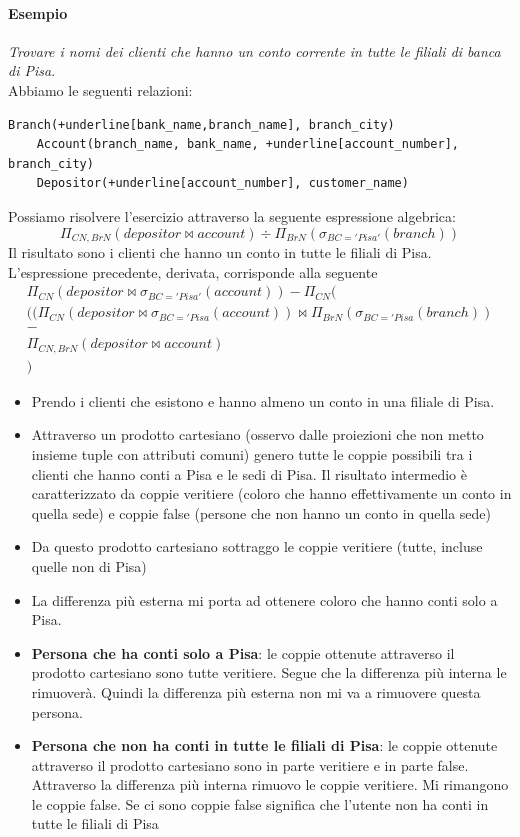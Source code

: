 \paragraph{Esempio} \emph{Trovare i nomi dei clienti che hanno un conto corrente in tutte le filiali di banca di Pisa}.\\Abbiamo le seguenti relazioni:
\begin{Verbatim}[commandchars=+\[\]]
	Branch(+underline[bank_name,branch_name], branch_city)
	Account(branch_name, bank_name, +underline[account_number], branch_city)
	Depositor(+underline[account_number], customer_name)
\end{Verbatim}
Possiamo risolvere l'esercizio attraverso la seguente espressione algebrica:
\[\Pi_{CN,BrN}(depositor \Join account) \div \Pi_{BrN}(\sigma_{BC='Pisa'}(branch))\]
Il risultato sono i clienti che hanno un conto in tutte le filiali di Pisa. L'espressione precedente, derivata, corrisponde alla seguente
\begin{align*}\Pi_{CN}(depositor \Join \sigma_{BC='Pisa'}(account)) - \Pi_{CN}(\\((\Pi_{CN}(depositor\Join \sigma_{BC='Pisa}(account)) \Join \Pi_{BrN}(\sigma_{BC='Pisa}(branch))\\-\\\Pi_{CN,BrN}(depositor \Join account)\\)\end{align*}
\begin{itemize}
	\item Prendo i clienti che esistono e hanno almeno un conto in una filiale di Pisa. 
	\item Attraverso un prodotto cartesiano (osservo dalle proiezioni che non metto insieme tuple con attributi comuni) genero tutte le coppie possibili tra i clienti che hanno conti a Pisa e le sedi di Pisa. Il risultato intermedio è caratterizzato da coppie veritiere (coloro che hanno effettivamente un conto in quella sede) e coppie false (persone che non hanno un conto in quella sede)
	\item Da questo prodotto cartesiano sottraggo le coppie veritiere (tutte, incluse quelle non di Pisa)
	\item La differenza più esterna mi porta ad ottenere coloro che hanno conti solo a Pisa.
	\item \textbf{Persona che ha conti solo a Pisa}: le coppie ottenute attraverso il prodotto cartesiano sono tutte veritiere. Segue che la differenza più interna le rimuoverà. Quindi la differenza più esterna non mi va a rimuovere questa persona.
	\item \textbf{Persona che non ha conti in tutte le filiali di Pisa}: le coppie ottenute attraverso il prodotto cartesiano sono in parte veritiere e in parte false. Attraverso la differenza più interna rimuovo le coppie veritiere. Mi rimangono le coppie false. Se ci sono coppie false significa che l'utente non ha conti in tutte le filiali di Pisa
\end{itemize}
